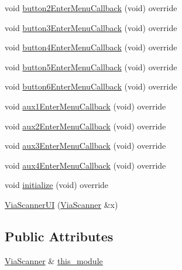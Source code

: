 \begin{DoxyCompactItemize}
void \mbox{\hyperlink{class_via_scanner_1_1_via_scanner_u_i_acb45c99dcac36f93d98621f6c53c9a0a}{button2\+Enter\+Menu\+Callback}} (void) override
\item 
void \mbox{\hyperlink{class_via_scanner_1_1_via_scanner_u_i_a32f8e4caa95371961883c90a5803f314}{button3\+Enter\+Menu\+Callback}} (void) override
\item 
void \mbox{\hyperlink{class_via_scanner_1_1_via_scanner_u_i_a45b4492b06d3b834c4934ace2d7d15aa}{button4\+Enter\+Menu\+Callback}} (void) override
\item 
void \mbox{\hyperlink{class_via_scanner_1_1_via_scanner_u_i_a337284dc48950fd3140b40ecca57122b}{button5\+Enter\+Menu\+Callback}} (void) override
\item 
void \mbox{\hyperlink{class_via_scanner_1_1_via_scanner_u_i_a94de9ec6e40e16ba7dd8dc0ffb9adc14}{button6\+Enter\+Menu\+Callback}} (void) override
\item 
void \mbox{\hyperlink{class_via_scanner_1_1_via_scanner_u_i_a4ca2d4cfed7e8e23f056c622a825c085}{aux1\+Enter\+Menu\+Callback}} (void) override
\item 
void \mbox{\hyperlink{class_via_scanner_1_1_via_scanner_u_i_a5173aaf7222a059fa7d3a4b32f6fb275}{aux2\+Enter\+Menu\+Callback}} (void) override
\item 
void \mbox{\hyperlink{class_via_scanner_1_1_via_scanner_u_i_ade6dc0e93911fe51731bffa65990599a}{aux3\+Enter\+Menu\+Callback}} (void) override
\item 
void \mbox{\hyperlink{class_via_scanner_1_1_via_scanner_u_i_a34c593dfd035906c09a2cde0024fd48f}{aux4\+Enter\+Menu\+Callback}} (void) override
\item 
void \mbox{\hyperlink{class_via_scanner_1_1_via_scanner_u_i_ab12af2665a9e58574cd0cb4b8a003e0b}{initialize}} (void) override
\item 
\mbox{\hyperlink{class_via_scanner_1_1_via_scanner_u_i_aa18dc59313da3e71d1d4cdb4509d7fa4}{Via\+Scanner\+UI}} (\mbox{\hyperlink{class_via_scanner}{Via\+Scanner}} \&x)
\end{DoxyCompactItemize}
\subsection*{Public Attributes}
\begin{DoxyCompactItemize}
\item 
\mbox{\hyperlink{class_via_scanner}{Via\+Scanner}} \& \mbox{\hyperlink{class_via_scanner_1_1_via_scanner_u_i_af7cdb107de6e5d4f45e1501233c1ac7c}{this\+\_\+module}}
\end{DoxyCompactItemize}


